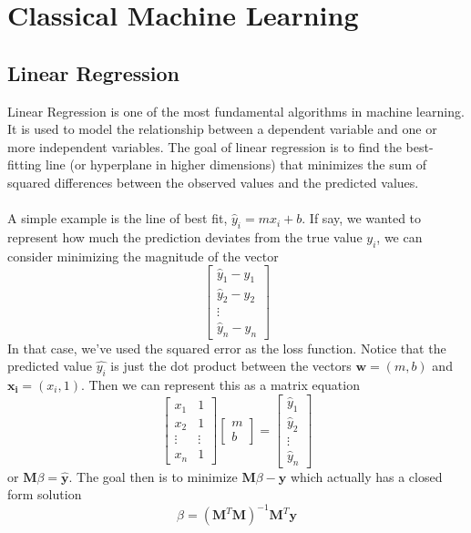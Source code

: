 \documentclass[11pt]{article}
\begin{document}
\newpage
\microtoc
\newpage

\section{Classical Machine Learning}
\subsection{Linear Regression}
Linear Regression is one of the most fundamental algorithms in machine learning. It is used to model the relationship between a dependent variable and one or more independent variables. 
The goal of linear regression is to find the best-fitting line (or hyperplane in higher dimensions) that minimizes the sum of squared differences between the observed values and the predicted values.
\\
\\
A simple example is the line of best fit, \(\hat{y}_i = mx_i + b\). If say, we wanted to represent how much the prediction deviates from the true value \(y_i\), we can consider minimizing the 
magnitude of the vector 
\[
    \begin{bmatrix}
    \hat{y}_1 - y_1 \\
    \hat{y}_2 - y_2 \\
    \vdots \\
    \hat{y}_n - y_n
    \end{bmatrix}
\]
\noindent In that case, we've used the squared error as the loss function. Notice that the predicted value \(\hat{y_i}\) is just the dot product between the vectors \(\mathbf{w} = (m, b)\) and \(\mathbf{x_i} = (x_i, 1)\). 
Then we can represent this as a matrix equation 
\[
    \begin{bmatrix}
    x_1 & 1 \\
    x_2 & 1 \\
    \vdots & \vdots \\
    x_n & 1
    \end{bmatrix}
    \begin{bmatrix}
    m \\
    b
    \end{bmatrix}
    =
    \begin{bmatrix}
    \hat{y}_1 \\
    \hat{y}_2 \\
    \vdots \\
    \hat{y}_n
    \end{bmatrix}
\]
or \(\mathbf{M}\beta = \mathbf{\hat{y}}\). The goal then is to minimize \(\mathbf{M}\beta - \mathbf{y}\) which actually has a closed form solution 
\[
    \beta = (\mathbf{M}^T\mathbf{M})^{-1}\mathbf{M}^T\mathbf{y}
\]
\end{document}
